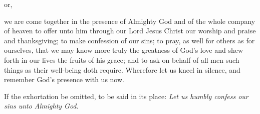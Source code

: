 \begin{inhead}
    or,
\end{inhead}
\par%
\noindent%
 we are come together in the presence of Almighty God and of the whole company of heaven to offer unto him through our Lord Jesus Christ our worship and praise and thanksgiving; to make confession of our sins; to pray, as well for others as for ourselves, that we may know more truly the greatness of God's love and shew forth in our lives the fruits of his grace; and to ask on behalf of all men such things as their well-being doth require. Wherefore let us kneel in silence, and remember God's presence with us now.

\begin{rubric}%
	If the exhortation be omitted, to be said in its place: \emph{Let us humbly confess our sins unto Almighty God.}
\end{rubric}

